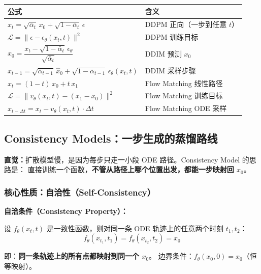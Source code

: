 \begin{summarybox}
\renewcommand{\arraystretch}{1.6}
\begin{tabular}{ll}
\hline
\textbf{公式} & \textbf{含义} \\
\hline
$x_t = \sqrt{\bar{\alpha}_t}\, x_0 + \sqrt{1-\bar{\alpha}_t}\,\epsilon$
  & DDPM 正向（一步到任意 $t$） \\[4pt]
$\mathcal{L} = \|\epsilon - \epsilon_\theta(x_t, t)\|^2$
  & DDPM 训练目标 \\[4pt]
$\hat{x}_0 = \dfrac{x_t - \sqrt{1-\bar{\alpha}_t}\,\epsilon_\theta}{\sqrt{\bar{\alpha}_t}}$
  & DDIM 预测 $x_0$ \\[8pt]
$x_{t-1} = \sqrt{\bar{\alpha}_{t-1}}\,\hat{x}_0
  + \sqrt{1-\bar{\alpha}_{t-1}}\,\epsilon_\theta(x_t, t)$
  & DDIM 采样步骤 \\[4pt]
$x_t = (1-t)\,x_0 + t\,x_1$
  & Flow Matching 线性路径 \\[4pt]
$\mathcal{L} = \|v_\theta(x_t, t) - (x_1 - x_0)\|^2$
  & Flow Matching 训练目标 \\[4pt]
$x_{t - \Delta t} = x_t - v_\theta(x_t, t) \cdot \Delta t$
  & Flow Matching ODE 采样 \\
\hline
\end{tabular}
\end{summarybox}

\subsection{Consistency Models：一步生成的蒸馏路线}

\begin{intubox}
\textbf{直觉：}扩散模型慢，是因为每步只走一小段 ODE 路径。Consistency Model 的思路是：
直接训练一个函数，\textbf{不管从路径上哪个位置出发，都能一步映射回 $x_0$}。
\end{intubox}

\subsubsection*{核心性质：自洽性（Self-Consistency）}

\begin{conceptbox}
\textbf{自洽条件（Consistency Property）：}

设 $f_\theta(x_t, t)$ 是一致性函数，则对同一条 ODE 轨迹上的任意两个时刻 $t_1, t_2$：
$$f_\theta(x_{t_1}, t_1) = f_\theta(x_{t_2}, t_2) = x_0$$

即：\textbf{同一条轨迹上的所有点都映射到同一个 $x_0$}。
边界条件：$f_\theta(x_0, 0) = x_0$（恒等映射）。
\end{conceptbox}

